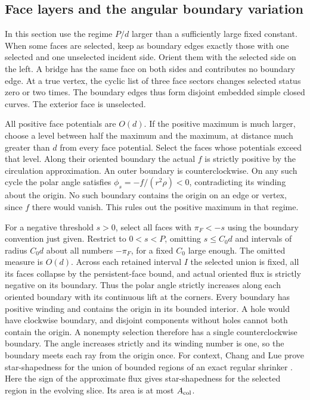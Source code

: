 \subsection{Face layers and the angular boundary variation}\label{sec:force}

In this section use the regime \(P/d\) larger than a sufficiently large fixed constant. When some faces are selected, keep as boundary edges exactly those with one selected and one unselected incident side. Orient them with the selected side on the left. A bridge has the same face on both sides and contributes no boundary edge. At a true vertex, the cyclic list of three face sectors changes selected status zero or two times. The boundary edges thus form disjoint embedded simple closed curves. The exterior face is unselected.

All positive face potentials are \(O(d)\). If the positive maximum is much larger, choose a level between half the maximum and the maximum, at distance much greater than \(d\) from every face potential. Select the faces whose potentials exceed that level. Along their oriented boundary the actual \(f\) is strictly positive by the circulation approximation. An outer boundary is counterclockwise. On any such cycle the polar angle satisfies \(\phi_s=-f/(r^2\rho)<0\), contradicting its winding about the origin. No such boundary contains the origin on an edge or vertex, since \(f\) there would vanish. This rules out the positive maximum in that regime.

For a negative threshold \(s>0\), select all faces with \(\pi_F<-s\) using the boundary convention just given. Restrict to \(0<s<P\), omitting \(s\le C_0 d\) and intervals of radius \(C_0 d\) about all numbers \(-\pi_F\), for a fixed \(C_0\) large enough. The omitted measure is \(O(d)\). Across each retained interval \(I\) the selected union is fixed, all its faces collapse by the persistent-face bound, and actual oriented flux is strictly negative on its boundary. Thus the polar angle strictly increases along each oriented boundary with its continuous lift at the corners. Every boundary has positive winding and contains the origin in its bounded interior. A hole would have clockwise boundary, and disjoint components without holes cannot both contain the origin. A nonempty selection therefore has a single counterclockwise boundary. The angle increases strictly and its winding number is one, so the boundary meets each ray from the origin once. For context, Chang and Lue prove star-shapedness for the union of bounded regions of an exact regular shrinker \cite[Lemma~3.1]{CL}. Here the sign of the approximate flux gives star-shapedness for the selected region in the evolving slice. Its area is at most \(A_{\rm col}\).

